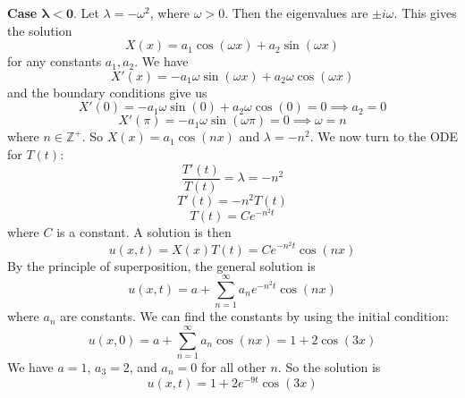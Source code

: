 \documentclass[plain]{pset}
\begin{document}
\begin{solution}
    \textbf{Case \(\mathbf{\lambda < 0}\)}. Let \(\lambda = -\omega^2\), where \(\omega > 0\). Then the eigenvalues are \(\pm i\omega\).
    This gives the solution
    \[X(x) = a_1\cos(\omega x) + a_2\sin(\omega x)\]
    for any constants \(a_1, a_2\).
    We have
    \[X'(x) = -a_1\omega\sin(\omega x) + a_2\omega\cos(\omega x)\]
    and the boundary conditions give us
    \[X'(0) = -a_1\omega\sin(0) + a_2\omega\cos(0) = 0 \implies a_2 = 0\]
    \[X'(\pi) = -a_1\omega\sin(\omega\pi) = 0 \implies \omega = n\]
    where \(n \in \mathbb{Z}^+\). So \(X(x) = a_1\cos(nx)\) and \(\lambda = -n^2\).
    We now turn to the ODE for \(T(t)\):
    \[\frac{T'(t)}{T(t)} = \lambda = -n^2\]
    \[T'(t) = -n^2T(t)\]
    \[T(t) = Ce^{-n^2t}\]
    where \(C\) is a constant.
    A solution is then
    \[u(x, t) = X(x)T(t) = Ce^{-n^2t}\cos(nx)\]
    By the principle of superposition, the general solution is
    \[u(x, t) = a + \sum_{n=1}^\infty a_n e^{-n^2t}\cos(nx)\]
    where \(a_n\) are constants. We can find the constants by using the initial condition:
    \[u(x, 0) = a + \sum_{n=1}^\infty a_n\cos(nx) = 1 + 2\cos(3x)\]
    We have \(a = 1\), \(a_3 = 2\), and \(a_n = 0\) for all other \(n\). So the solution is
    \[u(x, t) = 1 + 2e^{-9t}\cos(3x)\]
\end{solution}

\pagebreak
\end{document}
